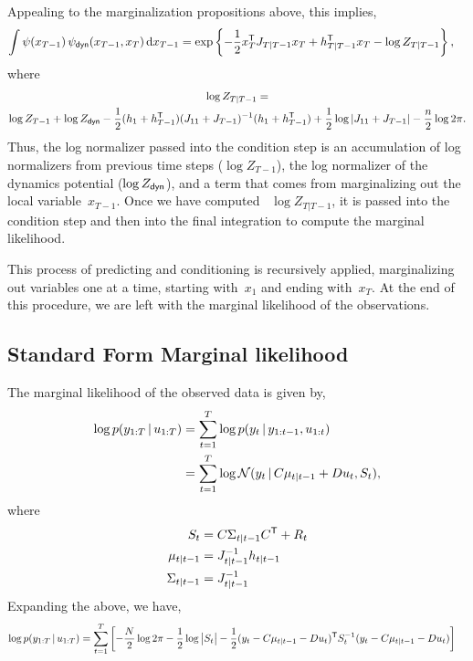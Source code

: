 \documentclass{article}
\begin{document}
Appealing to the marginalization propositions above, this implies,
\begin{align}
  \int \psi(x_{T-1}) \, \psi_{\sf dyn}(x_{T-1}, x_T) \, \mathrm{d} x_{T-1}
  &= \exp \left \{-\frac{1}{2} x_T^{\mathsf{T}} J_{T|T-1} x_T + h_{T|T-1}^{\mathsf{T}} x_T
  - \log Z_{T|T-1} \right \},
\end{align}
where
\begin{multline}
  \log Z_{T|T-1} = \\
  \log Z_{T-1} + \log Z_{\sf dyn} 
  -\frac{1}{2} (h_1 + h_{T-1}^{\mathsf{T}}) (J_{11} + J_{T-1})^{-1} (h_1 + h_{T-1}^{\mathsf{T}}) 
  + \frac{1}{2} \log |J_{11} + J_{T-1}| - \frac{n}{2} \log 2 \pi.
\end{multline}
Thus, the log normalizer passed into the condition step is an accumulation of
log normalizers from previous time steps ($\log Z_{T-1}$), the log normalizer
of the dynamics potential ($\log Z_{\sf dyn}$), and a term that comes from
marginalizing out the local variable~$x_{T-1}$. Once we have computed
~$\log Z_{T|T-1}$, it is passed into the condition step and then into the final
integration to compute the marginal likelihood.

This process of predicting and conditioning is recursively applied, marginalizing
out variables one at a time, starting with~$x_1$ and ending with~$x_T$. At the
end of this procedure, we are left with the marginal likelihood of the observations.

\subsection*{Standard Form Marginal likelihood}
The marginal likelihood of the observed data is given by,
\begin{align}
  \log p(y_{1:T} \,|\, u_{1:T})
  &= \sum_{t=1}^T \log p(y_t \,|\, y_{1:t-1}, u_{1:t}) \\
  &= \sum_{t=1}^T \log \mathcal{N}(y_t \,|\, C \mu_{t | t-1} + D u_t,  S_t),
\end{align}
where
\begin{align}
  S_t &= C \Sigma_{t | t-1} C^{\mathsf{T}} + R_t \\
  \mu_{t | t-1} &= J_{t | t-1}^{-1} h_{t|t-1} \\
  \Sigma_{t | t-1} &= J_{t|t-1}^{-1}
\end{align}
Expanding the above, we have,
\begin{align}
  \log p(y_{1:T} \,|\, u_{1:T})
  &= \sum_{t=1}^T \left[ -\frac{N}{2} \log 2 \pi - \frac{1}{2} \log \big| S_t  \big|  
     - \frac{1}{2} (y_t - C \mu_{t | t-1} - D u_t)^{\mathsf{T}} S_t^{-1}
     (y_t - C \mu_{t | t-1} - D u_t) \right]
\end{align}
\end{document}
